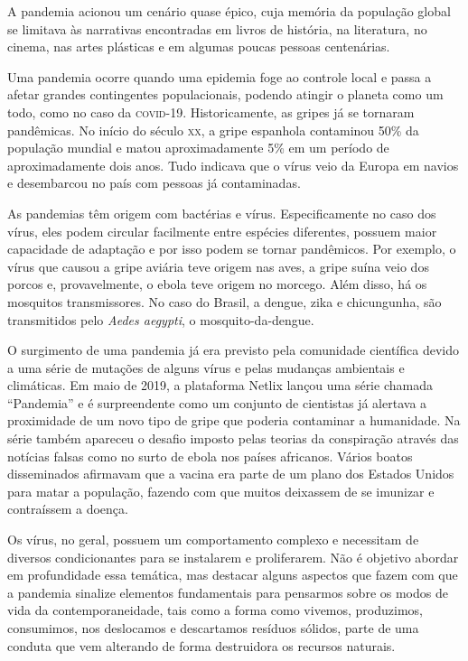 A pandemia acionou um cenário quase épico, cuja memória da população
global se limitava às narrativas encontradas em livros de história, na
literatura, no cinema, nas artes plásticas e em algumas poucas pessoas
centenárias.

Uma pandemia ocorre quando uma epidemia foge ao controle local e passa a
afetar grandes contingentes populacionais, podendo atingir o planeta
como um todo, como no caso da \textsc{covid-19}. Historicamente, as gripes já se
tornaram pandêmicas. No início do século \textsc{xx}, a gripe espanhola
contaminou 50\% da população mundial e matou aproximadamente 5\% em um
período de aproximadamente dois anos. Tudo indicava que o vírus veio da
Europa em navios e desembarcou no país com pessoas já contaminadas.

As pandemias têm origem com bactérias e vírus. Especificamente
no caso dos vírus, eles podem circular facilmente entre espécies
diferentes, possuem maior capacidade de adaptação e por isso podem se
tornar pandêmicos. Por exemplo, o vírus que causou a gripe
aviária teve origem nas aves, a gripe suína veio dos porcos e,
provavelmente, o ebola teve origem no morcego. Além disso, há os
mosquitos transmissores. No caso do Brasil, a dengue, zika e
chicungunha, são transmitidos pelo \textit{Aedes aegypti}, o mosquito-da-dengue.

O surgimento de uma pandemia já era previsto pela comunidade científica
devido a uma série de mutações de alguns vírus e pelas mudanças
ambientais e climáticas. Em maio de 2019, a plataforma Netlix lançou uma
série chamada ``Pandemia'' e é surpreendente como um conjunto de
cientistas já alertava a proximidade de um novo tipo de gripe que
poderia contaminar a humanidade. Na série também apareceu o desafio
imposto pelas teorias da conspiração através das notícias falsas como no
surto de ebola nos países africanos. Vários boatos disseminados
afirmavam que a vacina era parte de um plano dos Estados Unidos para
matar a população, fazendo com que muitos deixassem de se imunizar e
contraíssem a doença.

Os vírus, no geral, possuem um comportamento complexo e necessitam de
diversos condicionantes para se instalarem e proliferarem. Não é
objetivo abordar em profundidade essa temática, mas destacar alguns
aspectos que fazem com que a pandemia sinalize elementos fundamentais
para pensarmos sobre os modos de vida da contemporaneidade, tais como a
forma como vivemos, produzimos, consumimos, nos deslocamos e descartamos
resíduos sólidos, parte de uma conduta que vem alterando de forma
destruidora os recursos naturais.

